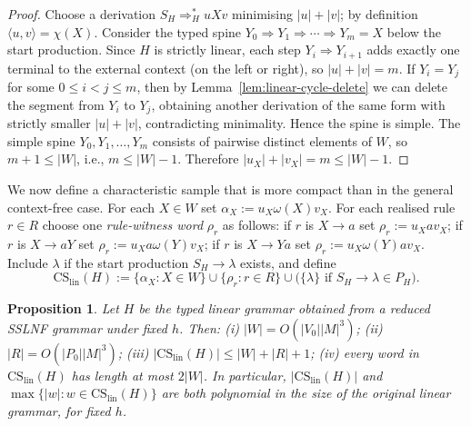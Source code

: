 \documentclass[11pt,a4paper]{article}
\newtheorem{proposition}[theorem]{Proposition}
\newcommand{\CS}{\mathrm{CS}}
\newcommand{\lin}{\mathrm{lin}}
\begin{document}
\begin{proof}
Choose a derivation $S_H\Rightarrow_H^* uXv$ minimising $|u|+|v|$; by definition
$\langle u,v\rangle=\chi(X)$.
Consider the typed spine $Y_0\Rightarrow Y_1\Rightarrow\cdots\Rightarrow Y_m=X$
below the start production.
Since $H$ is strictly linear, each step $Y_i\Rightarrow Y_{i+1}$ adds exactly one
terminal to the external context (on the left or right), so $|u|+|v|=m$.
If $Y_i=Y_j$ for some $0\le i<j\le m$, then by Lemma~\ref{lem:linear-cycle-delete}
we can delete the segment from $Y_i$ to $Y_j$, obtaining another derivation of the
same form with strictly smaller $|u|+|v|$, contradicting minimality.
Hence the spine is simple.
The simple spine $Y_0,Y_1,\dots,Y_m$ consists of pairwise distinct elements of $W$,
so $m+1\le|W|$, i.e., $m\le|W|-1$.
Therefore $|u_X|+|v_X|=m\le|W|-1$.
\end{proof}

We now define a characteristic sample that is more compact than in the general
context-free case.
For each $X\in W$ set $\alpha_X:=u_X\omega(X)v_X$.
For each realised rule $r\in R$ choose one \emph{rule-witness word} $\rho_r$ as follows:
if $r$ is $X\to a$ set $\rho_r:=u_Xav_X$;
if $r$ is $X\to aY$ set $\rho_r:=u_Xa\omega(Y)v_X$;
if $r$ is $X\to Ya$ set $\rho_r:=u_X\omega(Y)av_X$.
Include $\lambda$ if the start production $S_H\to\lambda$ exists, and define
\[
\CS_{\lin}(H):=\{\alpha_X:X\in W\}\cup\{\rho_r:r\in R\}
\cup\bigl(\{\lambda\}\text{ if }S_H\to\lambda\in P_H\bigr).
\]

\begin{proposition}
\label{prop:linear}
Let $H$ be the typed linear grammar obtained from a reduced SSLNF grammar under
fixed $h$.  Then:
\textup{(i)} $|W|=O(|V_0||M|^3)$;
\textup{(ii)} $|R|=O(|P_0||M|^3)$;
\textup{(iii)} $|\CS_{\lin}(H)|\le|W|+|R|+1$;
\textup{(iv)} every word in $\CS_{\lin}(H)$ has length at most $2|W|$.
In particular, $|\CS_{\lin}(H)|$ and $\max\{|w|:w\in\CS_{\lin}(H)\}$ are both
polynomial in the size of the original linear grammar, for fixed $h$.
\end{proposition}
\end{document}
